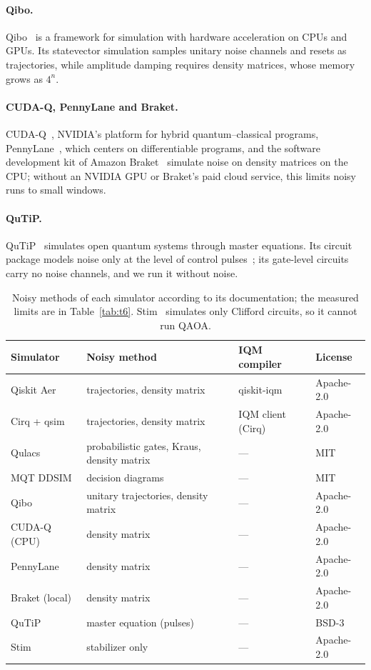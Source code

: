 \documentclass{scspaperproc}
\begin{document}
\paragraph{Qibo.}
Qibo~\cite{efthymiou2022qibo} is a framework for simulation with hardware
acceleration on CPUs and GPUs. Its statevector simulation samples unitary
noise channels and resets as trajectories, while amplitude damping requires
density matrices, whose memory grows as $4^n$.

\paragraph{CUDA-Q, PennyLane and Braket.}
CUDA-Q~\cite{kim2023cudaq}, NVIDIA's platform for hybrid quantum--classical
programs, PennyLane~\cite{bergholm2018pennylane}, which centers on
differentiable programs, and the software development kit of Amazon
Braket~\cite{braket} simulate noise on density matrices on the CPU; without an
NVIDIA GPU or Braket's paid cloud service, this limits noisy runs to small
windows.

\paragraph{QuTiP.}
QuTiP~\cite{johansson2013qutip,lambert2024qutip5} simulates open quantum
systems through master equations. Its circuit package models noise only at the
level of control pulses~\cite{li2022qutipqip}; its gate-level circuits carry no noise channels, and we run it without noise.

\begin{table}[t]
\caption{Noisy methods of each simulator according to its documentation; the
measured limits are in Table~\ref{tab:t6}. Stim~\cite{gidney2021stim} simulates
only Clifford circuits, so it cannot run QAOA.}
\label{tab:sims}
\centering
\small
\begin{tabular}{llll}
\toprule
Simulator & Noisy method & IQM compiler & License \\
\midrule
Qiskit Aer & trajectories, density matrix & qiskit-iqm & Apache-2.0 \\
Cirq + qsim & trajectories, density matrix & IQM client (Cirq) & Apache-2.0 \\
Qulacs & probabilistic gates, Kraus, density matrix & --- & MIT \\
MQT DDSIM & decision diagrams & --- & MIT \\
Qibo & unitary trajectories, density matrix & --- & Apache-2.0 \\
CUDA-Q (CPU) & density matrix & --- & Apache-2.0 \\
PennyLane & density matrix & --- & Apache-2.0 \\
Braket (local) & density matrix & --- & Apache-2.0 \\
QuTiP & master equation (pulses) & --- & BSD-3 \\
Stim & stabilizer only & --- & Apache-2.0 \\
\bottomrule
\end{tabular}
\end{table}
\end{document}
